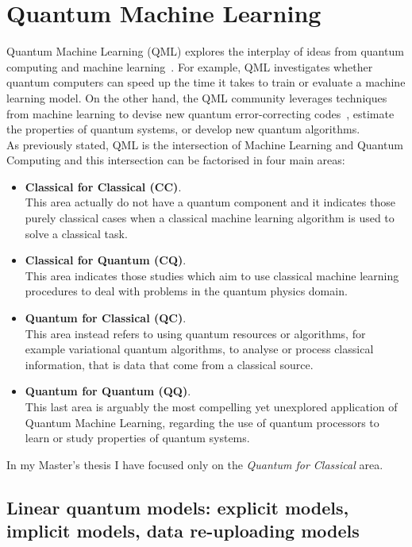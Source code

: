 \chapter{Quantum Machine Learning}

Quantum Machine Learning (QML) explores the interplay of ideas from quantum computing and
machine learning~\cite{Biamonte_2017}.
For example, QML investigates whether quantum computers can speed up the time it takes
to train or evaluate a machine learning model. On the other hand, the QML community
leverages techniques from machine learning to devise new quantum error-correcting codes~\cite{Roffe_2019}, 
estimate the properties of quantum systems, or develop new quantum algorithms.\\
As previously stated, QML is the intersection of Machine Learning and Quantum Computing and this intersection can be 
factorised in four main areas:


\begin{itemize}
    \item \textbf{Classical for Classical (CC)}.\\ This area actually do not have a quantum component and 
    it indicates those purely classical cases when a classical machine learning algorithm is used to solve 
    a classical task.
    \item \textbf{Classical for Quantum (CQ)}.\\ This area indicates those studies which aim to use classical
    machine learning procedures to deal with problems in the quantum physics domain.
    \item \textbf{Quantum for Classical (QC)}.\\ This area instead refers to using quantum resources or algorithms, 
    for example variational quantum algorithms, to analyse or process classical information, 
    that is data that come from a classical source.
    \item \textbf{Quantum for Quantum (QQ)}.\\ This last area is arguably the most compelling yet unexplored
    application of Quantum Machine Learning, regarding the use of quantum processors to
    learn or study properties of quantum systems.
\end{itemize}

In my Master's thesis I have focused only on the \textit{Quantum for Classical} area.\\


\section{Linear quantum models: explicit models, implicit models, data re-uploading models}

